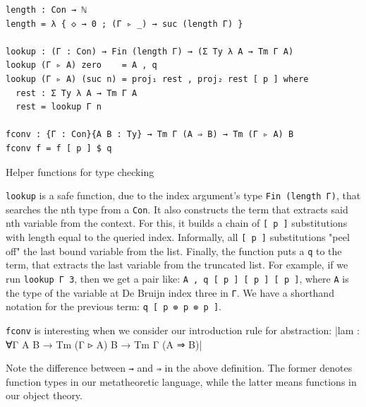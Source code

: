 \begin{listing}[H]
\begin{verbatim}
length : Con → ℕ
length = λ { ◇ → 0 ; (Γ ▹ _) → suc (length Γ) }

lookup : (Γ : Con) → Fin (length Γ) → (Σ Ty λ A → Tm Γ A)
lookup (Γ ▹ A) zero    = A , q
lookup (Γ ▹ A) (suc n) = proj₁ rest , proj₂ rest [ p ] where
  rest : Σ Ty λ A → Tm Γ A
  rest = lookup Γ n

fconv : {Γ : Con}{A B : Ty} → Tm Γ (A ⇒ B) → Tm (Γ ▹ A) B
fconv f = f [ p ] $ q

\end{verbatim}
\caption{Helper functions for type checking}
\label{code:typecheck-helpers}
\end{listing}

\verb$lookup$ is a safe function, due to the index argument's type \verb$Fin (length Γ)$, that searches the nth type from a \verb$Con$. It also constructs the term that extracts said nth variable from the context. For this, it builds a chain of \verb$[ p ]$ substitutions with length equal to the queried index. Informally, all \verb$[ p ]$ substitutions "peel off" the last bound variable from the list. Finally, the function puts a \verb$q$ to the term, that extracts the last variable from the truncated list. For example, if we run \verb$lookup Γ 3$, then we get a pair like: \verb$A , q [ p ] [ p ] [ p ]$, where \verb$A$ is the type of the variable at De Bruijn index three in \verb$Γ$. We have a shorthand notation for the previous term: \verb$q [ p ⊚ p ⊚ p ]$.

\verb$fconv$ is interesting when we consider our introduction rule for abstraction:
|lam : ∀{Γ A B} → Tm (Γ ▹ A) B → Tm Γ (A ⇒ B)|

Note the difference between \verb$→$ and \verb$⇒$ in the above definition. The former denotes function types in our metatheoretic language, while the latter means functions in our object theory.

